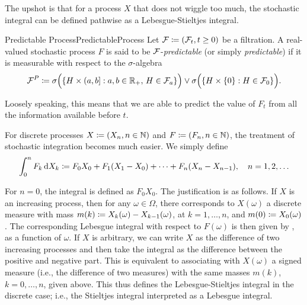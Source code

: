 The upshot is that for a process \(X\) that does not wiggle too much, the stochastic integral can be defined pathwise as a Lebesgue-Stieltjes integral.


\begin{defn}{Predictable Process}{PredictableProcess}
	Let \(\mathcal{F} \coloneqq (\mathcal{F}_t, t \ge 0)\) be a filtration. A real-valued stochastic process \(F\) is said to be \(\mathcal{F}\)-\emph{predictable} (or simply \emph{predictable}) if it is measurable with respect to the \(\sigma\)-algebra
	\begin{equation}\label{eq:PredictableSigmaAlgebra}
		\cF^P \coloneqq \sigma\Bigl( \set{ H \times \left(a,b\right] : a,b \in \R_+,\, H \in \cF_a } \Bigr) \lor \sigma\Bigl( \set{ H \times \{0\} : H \in \cF_0 } \Bigr).%
	\end{equation}
\end{defn}

Loosely speaking, this means that we are able to predict the value of \(F_t\) from all the information available before \(t\).

For discrete processes \(X \coloneqq (X_n, n \in \mathbb{N})\) and \(F \coloneqq (F_n, n \in \mathbb{N})\), the treatment of stochastic integration becomes much easier. We simply define
\begin{equation}\label{eq:DiscreteStochasticIntegral}
	\int_0^n F_k \, \mathrm{d} X_k \coloneqq F_0 X_0 + F_1 (X_1 - X_0) + \cdots + F_n (X_n - X_{n-1}), \quad n = 1, 2, \ldots
\end{equation}

For \(n = 0\), the integral is defined as \(F_0 X_0\). The justification is as follows. If \(X\) is an increasing process, then for any \(\omega \in \Omega\), there corresponds to \(X(\omega)\) a discrete measure with mass \(m(k) \coloneqq X_k(\omega) - X_{k-1}(\omega)\), at \(k = 1, \ldots, n\), and \(m(0) \coloneqq X_0(\omega)\). The corresponding Lebesgue integral with respect to \(F(\omega)\) is then given by , as a function of \(\omega\). If \(X\) is arbitrary, we can write \(X\) as the difference of two increasing processes and then take the integral as the difference between the positive and negative part. This is equivalent to associating with \(X(\omega)\) a signed measure (i.e., the difference of two measures) with the same masses \(m(k)\), \(k = 0, \ldots, n\), given above. This thus defines the Lebesgue-Stieltjes integral in the discrete case; i.e., the Stieltjes integral interpreted as a Lebesgue integral.

